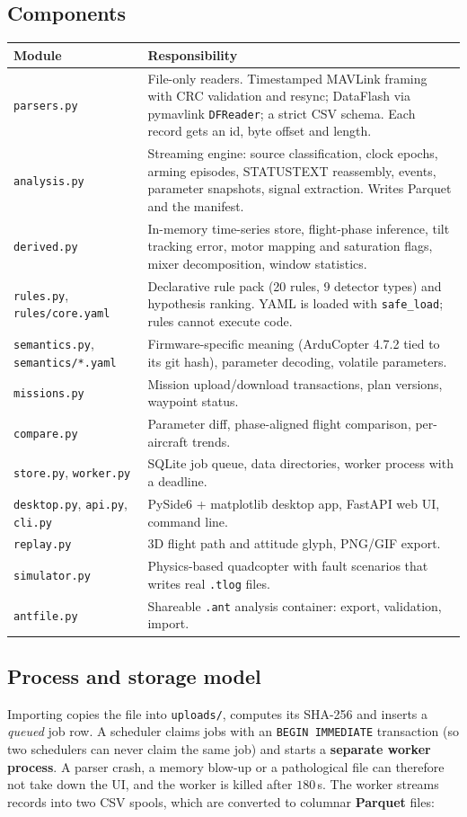 \documentclass[11pt,a4paper]{article}
\newcommand{\code}[1]{\texttt{#1}}
\begin{document}
\subsection{Components}

\begin{tabularx}{\linewidth}{@{}lX@{}}
\toprule
Module & Responsibility \\
\midrule
\code{parsers.py} & File-only readers. Timestamped MAVLink framing with CRC validation and resync;
DataFlash via pymavlink \code{DFReader}; a strict CSV schema. Each record gets an id, byte offset
and length. \\
\code{analysis.py} & Streaming engine: source classification, clock epochs, arming episodes,
STATUSTEXT reassembly, events, parameter snapshots, signal extraction. Writes Parquet and the
manifest. \\
\code{derived.py} & In-memory time-series store, flight-phase inference, tilt tracking error,
motor mapping and saturation flags, mixer decomposition, window statistics. \\
\code{rules.py}, \code{rules/core.yaml} & Declarative rule pack (20 rules, 9 detector types) and
hypothesis ranking. YAML is loaded with \code{safe\_load}; rules cannot execute code. \\
\code{semantics.py}, \code{semantics/*.yaml} & Firmware-specific meaning (ArduCopter 4.7.2 tied
to its git hash), parameter decoding, volatile parameters. \\
\code{missions.py} & Mission upload/download transactions, plan versions, waypoint status. \\
\code{compare.py} & Parameter diff, phase-aligned flight comparison, per-aircraft trends. \\
\code{store.py}, \code{worker.py} & SQLite job queue, data directories, worker process with a
deadline. \\
\code{desktop.py}, \code{api.py}, \code{cli.py} & PySide6 + matplotlib desktop app, FastAPI web UI,
command line. \\
\code{replay.py} & 3D flight path and attitude glyph, PNG/GIF export. \\
\code{simulator.py} & Physics-based quadcopter with fault scenarios that writes real \code{.tlog}
files. \\
\code{antfile.py} & Shareable \code{.ant} analysis container: export, validation, import. \\
\bottomrule
\end{tabularx}

\subsection{Process and storage model}
Importing copies the file into \code{uploads/}, computes its SHA-256 and inserts a \emph{queued}
job row. A scheduler claims jobs with an \code{BEGIN IMMEDIATE} transaction (so two schedulers
can never claim the same job) and starts a \textbf{separate worker process}. A parser crash, a
memory blow-up or a pathological file can therefore not take down the UI, and the worker is
killed after $180$\,s. The worker streams records into two CSV spools, which are converted to
columnar \textbf{Parquet} files:
\end{document}
